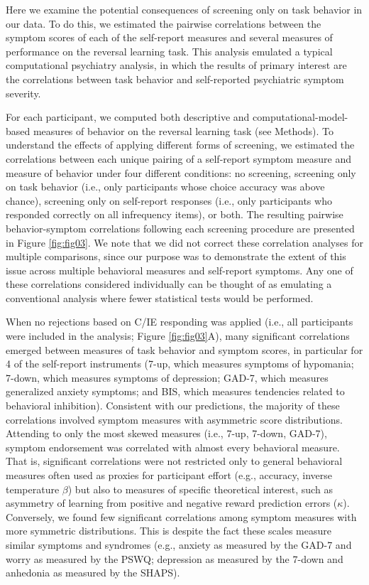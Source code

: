\documentclass[a4paper,notitlepage,12pt]{article}
\begin{document}
Here we examine the potential consequences of screening only on task behavior in our data. To do this, we estimated the pairwise correlations between the symptom scores of each of the self-report measures and several measures of performance on the reversal learning task. This analysis emulated a typical computational psychiatry analysis, in which the results of primary interest are the correlations between task behavior and self-reported psychiatric symptom severity.

For each participant, we computed both descriptive and computational-model-based measures of behavior on the reversal learning task (see Methods). To understand the effects of applying different forms of screening, we estimated the correlations between each unique pairing of a self-report symptom measure and measure of behavior under four different conditions: no screening, screening only on task behavior (i.e., only participants whose choice accuracy was above chance), screening only on self-report responses (i.e., only participants who responded correctly on all infrequency items), or both. The resulting pairwise behavior-symptom correlations following each screening procedure are presented in Figure \ref{fig:fig03}. We note that we did not correct these correlation analyses for multiple comparisons, since our purpose was to demonstrate the extent of this issue across multiple behavioral measures and self-report symptoms. Any one of these correlations considered individually can be thought of as emulating a conventional analysis where fewer statistical tests would be performed.

When no rejections based on C/IE responding was applied (i.e., all participants were included in the analysis; Figure \ref{fig:fig03}A), many significant correlations emerged between measures of task behavior and symptom scores, in particular for 4 of the self-report instruments (7-up, which measures symptoms of hypomania; 7-down, which measures symptoms of depression; GAD-7, which measures generalized anxiety symptoms; and BIS, which measures tendencies related to behavioral inhibition). Consistent with our predictions, the majority of these correlations involved symptom measures with asymmetric score distributions. Attending to only the most skewed measures (i.e., 7-up, 7-down, GAD-7), symptom endorsement was correlated with almost every behavioral measure. That is, significant correlations were not restricted only to general behavioral measures often used as proxies for participant effort (e.g., accuracy, inverse temperature $\beta$) but also to measures of specific theoretical interest, such as asymmetry of learning from positive and negative reward prediction errors ($\kappa$). Conversely, we found few significant correlations among symptom measures with more symmetric distributions. This is despite the fact these scales measure similar symptoms and syndromes (e.g., anxiety as measured by the GAD-7 and worry as measured by the PSWQ; depression as measured by the 7-down and anhedonia as measured by the SHAPS). 
\end{document}
